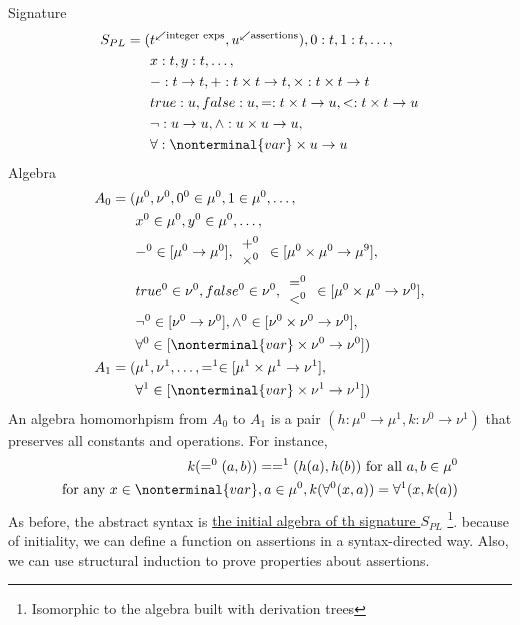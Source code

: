 \documentclass{report}[12pt]
\begin{document}
Signature
\begin{align*}
    S_{PL} = (&t^{\swarrow \text{integer exps}}, u^{\swarrow \text{assertions}}), 0:t, 1:t, \ldots, \\
    &x:t, y:t, \ldots, \\
    &-:t\rightarrow t, +:t \times t \rightarrow t, \times : t \times t \rightarrow t \\
    &true : u, false : u, =:t \times t \rightarrow u, < : t\times t \rightarrow u \\
    &\neg : u \rightarrow u, \wedge : u \times u \rightarrow u, \\
    &\forall : \nonterminal{var} \times u \rightarrow u
\end{align*}
Algebra
\begin{align*}
    A_0 = (&\mu^0, \nu^0, 0^0 \in \mu^0, 1 \in \mu^0, \ldots,  \\
    &x^0 \in \mu^0, y^0 \in \mu^0, \ldots, \\
    &-^0\in [\mu^0 \rightarrow \mu^0], \begin{array}{c}+^0 \\ \times^0 \end{array} \in [\mu^0 \times \mu^0 \rightarrow \mu^9], \\
    &true^0 \in \nu^0, false^0 \in \nu^0, \begin{array}{c} =^0 \\ <^0 \end{array} \in [\mu^0 \times \mu^0 \rightarrow \nu^0], \\
    &\neg^0 \in [\nu^0 \rightarrow \nu^0], \wedge^0 \in [\nu^0 \times \nu^0 \rightarrow \nu^0], \\
    &\forall^0 \in [\nonterminal{var} \times \nu^0 \rightarrow \nu^0]) \\
    A_1 = (&\mu^1, \nu^1, \ldots, =^1 \in [\mu^1 \times \mu^1 \rightarrow \nu^1], \\
    &\forall^1\in [\nonterminal{var} \times \nu^1 \rightarrow \nu^1])
\end{align*}
An algebra homomorhpism from $A_0$ to $A_1$ is a pair $(h:\mu^0\rightarrow \mu^1, k:\nu^0\rightarrow\nu^1)$ that preserves all constants and operations. For instance,
\begin{align*}
    k(=^0 (a, b)) = =^1 (h(a), h(b)) \text{ for all }a, b\in \mu^0 \\
    \text{for any }x\in \nonterminal{var}, a\in \mu^0, k(\forall^0 (x, a)) = \forall^1 (x, k(a))
\end{align*}
As before, the abstract syntax is \underline{the initial algebra of th signature $S_{PL}$} \footnote{Isomorphic to the algebra built with derivation trees}. because of initiality, we can define a function on assertions in a syntax-directed way. Also, we can use structural induction to prove properties about assertions.
\end{document}
